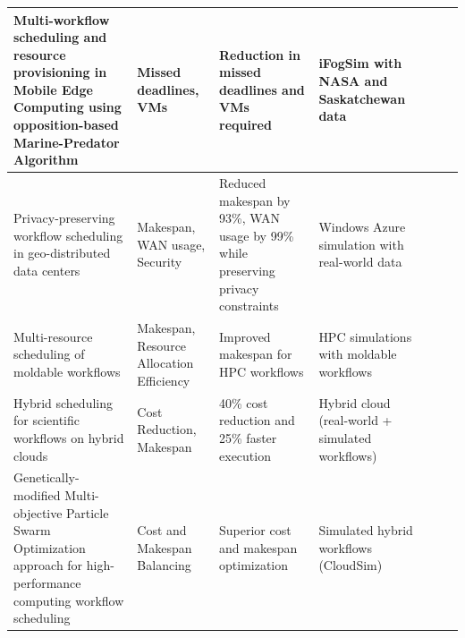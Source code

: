 \documentclass[a4paper, final]{article}
\begin{document}
\begin{table}[H]
\begin{tabularx}{\textwidth}{|p{3.5cm}|X|X|X|X|X|X|}
    Multi-workflow scheduling and resource provisioning in Mobile Edge Computing using opposition-based Marine-Predator Algorithm \cite{bib:6_marine} &
    Missed deadlines, VMs &
    Reduction in missed deadlines and VMs required &
    iFogSim with NASA and Saskatchewan data \\
    \hline

    Privacy-preserving workflow scheduling in geo-distributed data centers \cite{bib:7_ppps} &
    Makespan, WAN usage, Security &
    Reduced makespan by 93\%, WAN usage by 99\% while preserving privacy constraints &
    Windows Azure simulation with real-world data \\
    \hline

    Multi-resource scheduling of moldable workflows \cite{bib:8} &
    Makespan, Resource Allocation Efficiency &
    Improved makespan for HPC workflows &
    HPC simulations with moldable workflows \\
    \hline

    Hybrid scheduling for scientific workflows on hybrid clouds \cite{bib:9} &
    Cost Reduction, Makespan &
    40\% cost reduction and 25\% faster execution &
    Hybrid cloud (real-world + simulated workflows) \\
    \hline

    Genetically-modified Multi-objective Particle Swarm Optimization
    approach for high-performance computing workflow scheduling \cite{bib:10} &
    Cost and Makespan Balancing &
    Superior cost and makespan optimization &
    Simulated hybrid workflows (CloudSim) \\
    \hline
    \end{tabularx}
\end{table}
\end{document}
